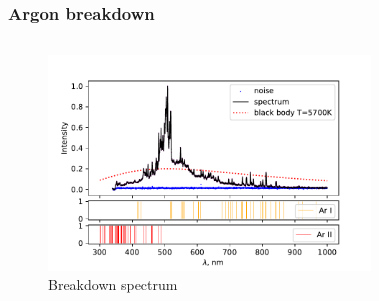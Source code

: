 \documentclass{beamer}
\begin{document}
	\begin{frame}
		\frametitle{Argon breakdown}
		\begin{columns}
			\begin{figure}
				\centering
				\includegraphics[width=1.1\linewidth]{gen/ar_lines.pdf}
				\caption*{Breakdown spectrum}
			\end{figure}	
			\begin{figure}
				\centering

\end{figure}
\end{columns}
\end{frame}
\end{document}
